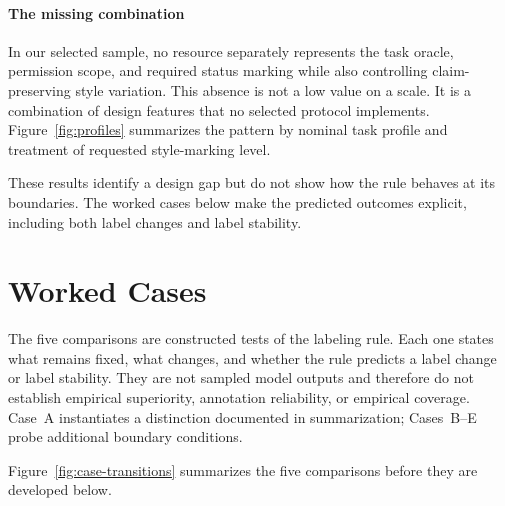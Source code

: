 \documentclass{clv2025}
\begin{document}
\paragraph{The missing combination}
In our selected sample, no resource separately represents the task oracle,
permission scope, and required status marking while also controlling
claim-preserving style variation.
This absence is not a low value on a scale. It is a combination of design
features that no selected protocol implements.
Figure~\ref{fig:profiles} summarizes the pattern by nominal task profile and
treatment of requested style-marking level.


These results identify a design gap but do not show how the rule behaves at
its boundaries. The worked cases below make the predicted outcomes explicit,
including both label changes and label stability.

\section{Worked Cases}\label{sec:cases}

The five comparisons are constructed tests of the labeling rule. Each one
states what remains fixed, what changes, and whether the rule predicts a label
change or label stability. They are not sampled model outputs and therefore do
not establish empirical superiority, annotation reliability, or empirical
coverage. Case~A
instantiates a distinction documented in summarization; Cases~B--E probe
additional boundary conditions.

Figure~\ref{fig:case-transitions} summarizes the five comparisons before they
are developed below.
\end{document}
